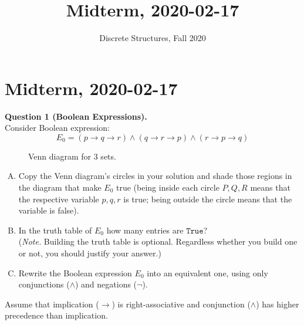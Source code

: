 \documentclass[jou]{apa6}
\title{Midterm, 2020-02-17}
\author{Discrete Structures, Fall 2020}
\affiliation{RBS}
\begin{document}

\twocolumn
\section{Midterm, 2020-02-17}

\vspace{6pt}
{\bf Question 1 (Boolean Expressions).}\\
Consider Boolean expression:
$$E_0 = (p \rightarrow q \rightarrow r) \wedge (q \rightarrow r \rightarrow p) \wedge (r \rightarrow p \rightarrow q)$$
\begin{figure}[!htb]
\caption{\label{fig:venn-circles} Venn diagram for 3 sets.}
\end{figure}

\begin{enumerate}[(A)]
\item Copy the Venn diagram's circles in your solution and shade those regions in the diagram that make $E_0$ true
(being inside each circle $P,Q,R$ means that the respective variable $p,q,r$ is true; being outside the circle means
that the variable is false). 
\item In the truth table of $E_0$ how many entries are $\mathtt{True}$?\\
({\em Note.} Building the truth table is optional. Regardless whether you build one or not, you should justify your answer.)
\item Rewrite the Boolean expression $E_0$ into an equivalent one, using 
only conjunctions ($\wedge$) and negations ($\neg$). 
\end{enumerate}

Assume that implication ($\rightarrow$) is right-associative 
and conjunction ($\wedge$) has higher precedence than implication. 
\end{document}

